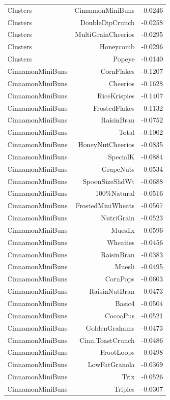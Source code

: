 \begin{longtable}{@{}lrr@{}}
Clusters & CinnamonMiniBuns & -0.0246 \\
Clusters & DoubleDipCrunch & -0.0258 \\
Clusters & MultiGrainCheerios & -0.0295 \\
Clusters & Honeycomb & -0.0296 \\
Clusters & Popeye & -0.0140 \\
CinnamonMiniBuns & CornFlakes & -0.1207 \\
CinnamonMiniBuns & Cheerios & -0.1628 \\
CinnamonMiniBuns & RiceKrispies & -0.1407 \\
CinnamonMiniBuns & FrostedFlakes & -0.1132 \\
CinnamonMiniBuns & RaisinBran & -0.0752 \\
CinnamonMiniBuns & Total & -0.1002 \\
CinnamonMiniBuns & HoneyNutCheerios & -0.0835 \\
CinnamonMiniBuns & SpecialK & -0.0884 \\
CinnamonMiniBuns & GrapeNuts & -0.0534 \\
CinnamonMiniBuns & SpoonSizeShdWt & -0.0688 \\
CinnamonMiniBuns & 100\%Natural & -0.0516 \\
CinnamonMiniBuns & FrostedMiniWheats & -0.0567 \\
CinnamonMiniBuns & NutriGrain & -0.0523 \\
CinnamonMiniBuns & Mueslix & -0.0596 \\
CinnamonMiniBuns & Wheaties & -0.0456 \\
CinnamonMiniBuns & RaisinBran & -0.0383 \\
CinnamonMiniBuns & Muesli & -0.0495 \\
CinnamonMiniBuns & CornPops & -0.0603 \\
CinnamonMiniBuns & RaisinNutBran & -0.0473 \\
CinnamonMiniBuns & Basic4 & -0.0504 \\
CinnamonMiniBuns & CocoaPus & -0.0521 \\
CinnamonMiniBuns & GoldenGrahams & -0.0473 \\
CinnamonMiniBuns & Cinn.ToastCrunch & -0.0486 \\
CinnamonMiniBuns & FrootLoops & -0.0498 \\
CinnamonMiniBuns & LowFatGranola & -0.0369 \\
CinnamonMiniBuns & Trix & -0.0526 \\
CinnamonMiniBuns & Triples & -0.0307 \\

\end{longtable}
